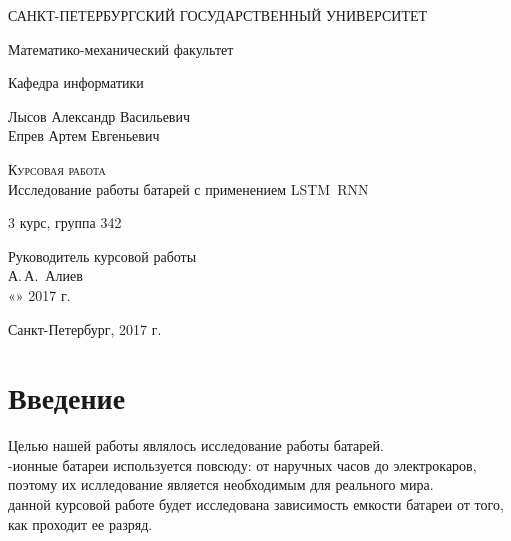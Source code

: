 \documentclass[russian,english,18pt,a4paper,reqno,dviphfm]{article}
\begin{document}

\begin{titlepage}
  \begin{center}

    САНКТ-ПЕТЕРБУРГСКИЙ ГОСУДАРСТВЕННЫЙ УНИВЕРСИТЕТ
    \vspace{3.25cm}

    Математико-механический факультет

    Кафедра информатики
    \vspace{3.25cm}


    Лысов Александр Васильевич \\
    Епрев Артем Евгеньевич
    \vfill

    \textsc{Курсовая работа}\\[5mm]

    {\LARGE{Исследование работы батарей с применением LSTM~RNN}}
    \bigskip

    3 курс, группа 342
  \end{center}
  \vfill

  \newlength{\ML}
  \vfill
  \hfill\begin{minipage}{0.4\textwidth}
    Руководитель курсовой работы\\
    \underline{\hspace{\ML}} А.\,А.~Алиев\\
    «\underline{\hspace{0.7cm}}» \underline{\hspace{2cm}} 2017 г.
  \end{minipage}%

  \vfill

  \begin{center}
    Санкт-Петербург, 2017 г.
  \end{center}
\end{titlepage}

\newpage

\tableofcontents

\newpage

\section{Введение}
Целью нашей работы являлось исследование работы батарей. \\
-ионные батареи используется повсюду: от наручных часов до электрокаров, поэтому их ислледование является необходимым для реального мира. \\
 данной курсовой работе будет исследована зависимость емкости батареи от того, как проходит ее разряд.
\newpage
\end{document}
